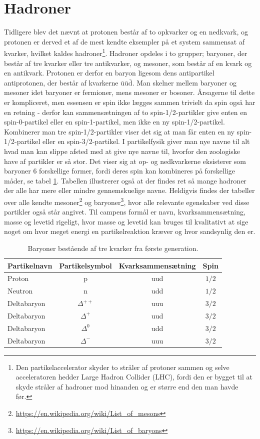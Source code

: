 \section{Hadroner}
Tidligere blev det nævnt at protonen består af to opkvarker og en nedkvark, og protonen er derved et af de mest kendte eksempler på et system sammensat af kvarker, hvilket kaldes hadroner\footnote{Den partikelaccelerator skyder to stråler af protoner sammen og selve acceleratoren hedder Large Hadron Collider (LHC), fordi den er bygget til at skyde stråler af hadroner mod hinanden og er større end den man havde før.}. Hadroner opdeles i to grupper; baryoner, der består af tre kvarker eller tre antikvarker, og mesoner, som består af en kvark og en antikvark. Protonen er derfor en baryon ligesom dens antipartikel antiprotonen, der består af kvarkerne $\bar{\mathrm u}\bar{\mathrm u}\bar{\mathrm d}$. Man skelner mellem baryoner og mesoner idet baryoner er fermioner, mens mesoner er bosoner. Årsagerne til dette er kompliceret, men essensen er spin ikke lægges sammen trivielt da spin også har en retning - derfor kan sammensætningen af to spin-1/2-partikler give enten en spin-0-partikel eller en spin-1-partikel, men ikke en ny spin-1/2-partikel. Kombinerer man tre spin-1/2-partikler viser det sig at man får enten en ny spin-1/2-partikel eller en spin-3/2-partikel. I partikelfysik giver man nye navne til alt hvad man kan slippe afsted med at give nye navne til, hvorfor den zoologiske have af partikler er så stor. Det viser sig at op- og nedkvarkerne eksisterer som baryoner 6 forskellige former, fordi deres spin kan kombineres på forskellige måder, se tabel \ref{tab:baryoner_gen1}. Tabellen illustrerer også at der findes ret så mange hadroner der alle har mere eller mindre gennemskuelige navne. Heldigvis findes der tabeller over alle kendte mesoner\footnote{\url{https://en.wikipedia.org/wiki/List_of_mesons}} og baryoner\footnote{\url{https://en.wikipedia.org/wiki/List_of_baryons}}, hvor alle relevante egenskaber ved disse partikler også står angivet. Til campens formål er navn, kvarksammensætning, masse og levetid rigeligt, hvor masse og levetid kan bruges til kvalitativt at sige noget om hvor meget energi en partikelreaktion kræver og hvor sandsynlig den er.
%
\begin{table}[]
    \centering
    \begin{tabular}{l|ccc}
        Partikelnavn & Partikelsymbol & Kvarksammensætning & Spin \\ \hline
        Proton & p & uud & $1/2$ \\
        Neutron & n & udd & $1/2$ \\
        Deltabaryon & $\Delta^{++}$ & uuu & $3/2$ \\
        Deltabaryon & $\Delta^{+}$ & uud & $3/2$ \\
        Deltabaryon & $\Delta^{0}$ & udd & $3/2$ \\
        Deltabaryon & $\Delta^{-}$ & uuu & $3/2$ \\
    \end{tabular}
    \caption{Baryoner bestående af tre kvarker fra første generation.}
    \label{tab:baryoner_gen1}
\end{table}

